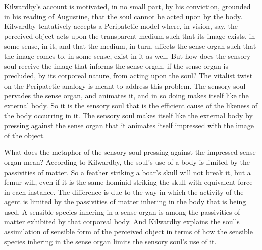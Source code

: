 \documentclass[12pt]{article}
\begin{document}
Kilwardby's account is motivated, in no small part, by his conviction, grounded in his reading of Augustine, that the soul cannot be acted upon by the body. Kilwardby tentatively accepts a Peripatetic model where, in vision, say, the perceived object acts upon the transparent medium such that its image exists, in some sense, in it, and that the medium, in turn, affects the sense organ such that the image comes to, in some sense, exist in it as well. But how does the sensory soul receive the image that informs the sense organ, if the sense organ is precluded, by its corporeal nature, from acting upon the soul? The vitalist twist on the Peripatetic analogy is meant to address this problem. The sensory soul pervades the sense organ, and animates it, and in so doing makes itself like the external body. So it is the sensory soul that is the efficient cause of the likeness of the body occurring in it. The sensory soul makes itself like the external body by pressing against the sense organ that it animates itself impressed with the image of the object.

What does the metaphor of the sensory soul pressing against the impressed sense organ mean? According to Kilwardby, the soul's use of a body is limited by the passivities of matter. So a feather striking a boar's skull will not break it, but a femur will, even if it is the same hominid striking the skull with equivalent force in each instance. The difference is due to the way in which the activity of the agent is limited by the passivities of matter inhering in the body that is being used. A sensible species inhering in a sense organ is among the passivities of matter exhibited by that corporeal body. And Kilwardby explains the soul's assimilation of sensible form of the perceived object in terms of how the sensible species inhering in the sense organ limits the sensory soul's use of it.
\end{document}
